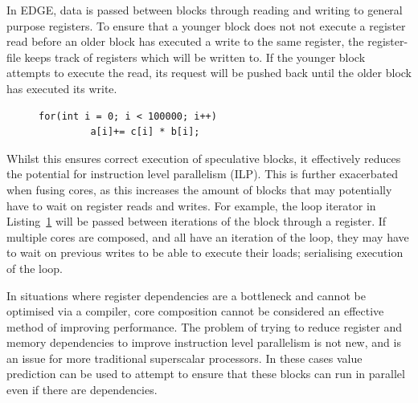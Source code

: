 
In EDGE, data is passed between blocks through reading and writing to general purpose registers.
To ensure that a younger block does not not execute a register read before an older block has executed a write to the same register, the register-file keeps track of registers which will be written to.
If the younger block attempts to execute the read, its request will be pushed back until the older block has executed its write.


\begin{figure}[t]
\lstset{language=C,numbersep=4pt}
\begin{center}
\begin{lstlisting}
for(int i = 0; i < 100000; i++)
         a[i]+= c[i] * b[i];
\end{lstlisting}
\end{center}
\vspace{-1em}
\label{lst:chp3:small}
\vspace{1em}
\end{figure}

Whilst this ensures correct execution of speculative blocks, it effectively reduces the potential for instruction level parallelism (ILP).
This is further exacerbated when fusing cores, as this increases the amount of blocks that may potentially have to wait on register reads and writes.
For example, the loop iterator in Listing~\ref{lst:chp3:small} will be passed between iterations of the block through a register.
If multiple cores are composed, and all have an iteration of the loop, they may have to wait on previous writes to be able to execute their loads; serialising execution of the loop.

In situations where register dependencies are a bottleneck and cannot be optimised via a compiler, core composition cannot be considered an effective method of improving performance.
The problem of trying to reduce register and memory dependencies to improve instruction level parallelism is not new, and is an issue for more traditional superscalar processors.
In these cases value prediction can be used to attempt to ensure that these blocks can run in parallel even if there are dependencies.

